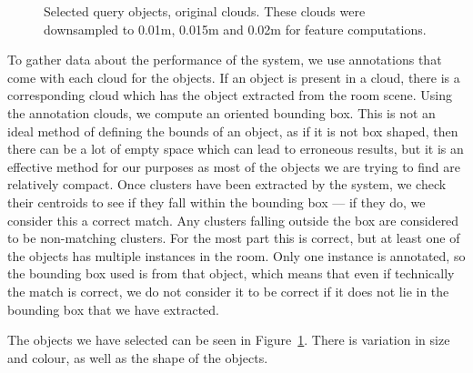 \documentclass[11pt,a4paper]{kth-mag}
\begin{document}
\begin{figure}
{{\begin{tabular}{c}
      \end{tabular}
    }
    }
    \caption{Selected query objects, original clouds. These clouds were
      downsampled to 0.01m, 0.015m and 0.02m for feature computations.}
  \label{fig:queryobj}
\end{figure}

To gather data about the performance of the system, we use annotations that come
with each cloud for the objects. If an object is present in a cloud, there is a
corresponding cloud which has the object extracted from the room scene. Using
the annotation clouds, we compute an oriented bounding box. This is not an ideal
method of defining the bounds of an object, as if it is not box shaped, then
there can be a lot of empty space which can lead to erroneous results, but it is
an effective method for our purposes as most of the objects we are trying to
find are relatively compact. Once clusters have been extracted by the system, we
check their centroids to see if they fall within the bounding box --- if they
do, we consider this a correct match. Any clusters falling outside the box are
considered to be non-matching clusters. For the most part this is correct, but
at least one of the objects has multiple instances in the room. Only one
instance is annotated, so the bounding box used is from that object, which means
that even if technically the match is correct, we do not consider it to be
correct if it does not lie in the bounding box that we have extracted.

The objects we have selected can be seen in Figure~\ref{fig:queryobj}. There is
variation in size and colour, as well as the shape of the objects.
\end{document}
